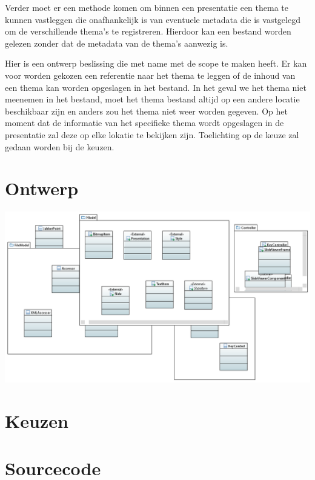 \documentclass[a4paper]{article}
\begin{document}
Verder moet er een methode komen om binnen een presentatie een thema te kunnen vastleggen die onafhankelijk is van eventuele metadata die is vastgelegd om de verschillende thema's te registreren. Hierdoor kan een bestand worden gelezen zonder dat de metadata van de thema's aanwezig is.

Hier is een ontwerp beslissing die met name met de scope te maken heeft. Er kan voor worden gekozen een referentie naar het thema te leggen of de inhoud van een thema kan worden opgeslagen in het bestand. In het geval we het thema niet meenemen in het bestand, moet het thema bestand altijd op een andere locatie beschikbaar zijn en anders zou het thema niet weer worden gegeven. Op het moment dat de informatie van het specifieke thema wordt opgeslagen in de presentatie zal deze op elke lokatie te bekijken zijn. Toelichting op de keuze zal gedaan worden bij de keuzen.

\section{Ontwerp}

\includegraphics[width=14cm]{design.png}

\section{Keuzen}



\section{Sourcecode}
\end{document}
